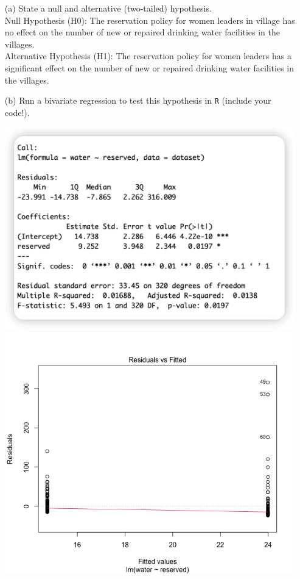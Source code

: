 \documentclass[12pt,letterpaper]{article}
\begin{document}
\newpage
\begin{enumerate}
	\item [(a)] State a null and alternative (two-tailed) hypothesis.\\ 
	\noindent 
	Null Hypothesis (H0):
	The reservation policy for women leaders in village has no effect on the number of new or repaired drinking water facilities in the villages.
	\vspace{1cm}
	\noindent\\ 
	Alternative Hypothesis (H1):
	The reservation policy for women leaders has a significant effect on the number of new or repaired drinking water facilities in the villages.
	\vspace{1cm}
	\item [(b)] Run a bivariate regression to test this hypothesis in \texttt{R} (include your code!).
	
	\vspace{1cm}
	\includegraphics[width=0.99\textwidth]{P02_my_answers_daijin_zhou.png}
	\includegraphics[width=0.99\textwidth]{P02_my_answers_daijin_zhou_2b.png}

\end{enumerate}
\end{document}
